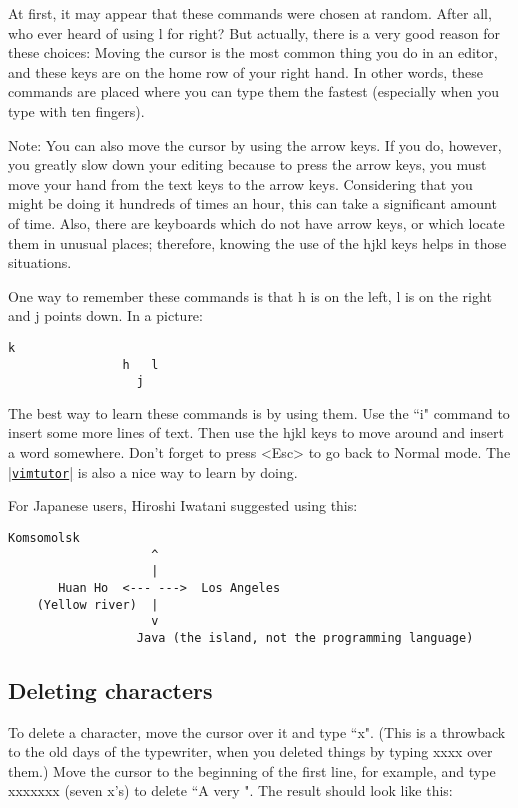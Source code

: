 At first, it may appear that these commands were chosen at random.
After all, who ever heard of using l for right?  But actually, there is a very good reason for these choices: Moving the cursor is the most common thing you do in an editor, and these keys are on the home row of your right hand.
In other words, these commands are placed where you can type them the fastest (especially when you type with ten fingers).

Note:
You can also move the cursor by using the arrow keys.
If you do, however, you greatly slow down your editing because to press the arrow keys, you must move your hand from the text keys to the arrow keys.
Considering that you might be doing it hundreds of times an hour, this can take a significant amount of time.
Also, there are keyboards which do not have arrow keys, or which locate them in unusual places; therefore, knowing the use of the hjkl keys helps in those situations.

One way to remember these commands is that h is on the left, l is on the right and j points down.
In a picture: 

\begin{Verbatim}[samepage=true]
				  k
				h   l
				  j
\end{Verbatim}

The best way to learn these commands is by using them.
Use the ``i" command to insert some more lines of text.
Then use the hjkl keys to move around and insert a word somewhere.
Don't forget to press <Esc> to go back to Normal mode.
The \hyperref[vimtutor]{|\texttt{vimtutor}|} is also a nice way to learn by doing.

For Japanese users, Hiroshi Iwatani suggested using this:

\begin{Verbatim}[samepage=true]
                Komsomolsk
                    ^
                    |
       Huan Ho  <--- --->  Los Angeles
    (Yellow river)  |
                    v
                  Java (the island, not the programming language)
\end{Verbatim}

\subsection{Deleting characters}

To delete a character, move the cursor over it and type ``x".
(This is a throwback to the old days of the typewriter, when you deleted things by typing xxxx over them.)
Move the cursor to the beginning of the first line, for example, and type xxxxxxx (seven x's) to delete ``A very ".
The result should look like this: 

